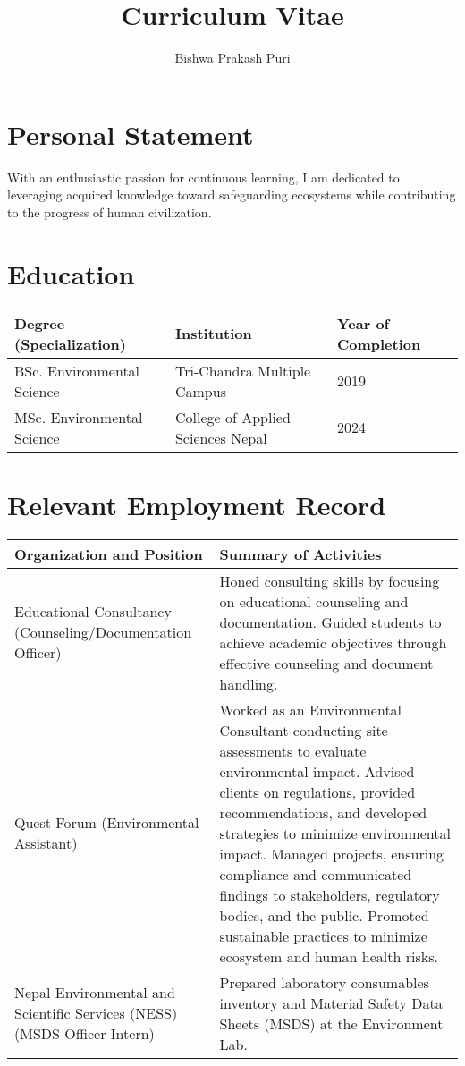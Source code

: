 \documentclass[a4paper,12pt]{article}
\title{Curriculum Vitae}
\author{Bishwa Prakash Puri}
\date{}
\begin{document}
\maketitle

\section*{Personal Statement}
With an enthusiastic passion for continuous learning, I am dedicated to leveraging acquired knowledge toward safeguarding ecosystems while contributing to the progress of human civilization.



\section*{Education}
\begin{tabular}{|p{}|p{}|p{}|} %
\toprule
\textbf{Degree (Specialization)} & \textbf{Institution} & \textbf{Year of Completion} \\
\midrule
BSc. Environmental Science & Tri-Chandra Multiple Campus & 2019 \\
\midrule
MSc. Environmental Science & College of Applied Sciences Nepal & 2024 \\
\bottomrule
\end{tabular}


\section*{Relevant Employment Record}
\begin{tabular}{|p{}|p{}|} %
\hline
\textbf{Organization and Position} & \textbf{Summary of Activities} \\
\hline
Educational Consultancy (Counseling/Documentation Officer) & Honed consulting skills by focusing on educational counseling and documentation. Guided students to achieve academic objectives through effective counseling and document handling. \\
\hline
Quest Forum (Environmental Assistant) & Worked as an Environmental Consultant conducting site assessments to evaluate environmental impact. Advised clients on regulations, provided recommendations, and developed strategies to minimize environmental impact. Managed projects, ensuring compliance and communicated findings to stakeholders, regulatory bodies, and the public. Promoted sustainable practices to minimize ecosystem and human health risks. \\
\hline
Nepal Environmental and Scientific Services (NESS) (MSDS Officer Intern) & Prepared laboratory consumables inventory and Material Safety Data Sheets (MSDS) at the Environment Lab. \\
\hline
\end{tabular}
\end{document}
